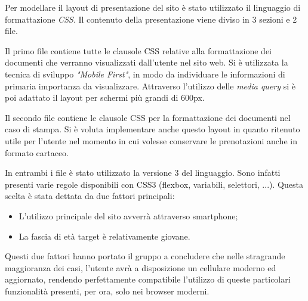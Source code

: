 Per modellare il layout di presentazione del sito è stato utilizzato il linguaggio di formattazione \textit{CSS}. Il contenuto della presentazione viene diviso in 3 sezioni e 2 file.

Il primo file contiene tutte le clausole CSS relative alla formattazione dei documenti che verranno visualizzati dall'utente nel sito web. Si è utilizzata la tecnica di sviluppo \textit{"Mobile First"}, in modo da individuare le informazioni di primaria importanza da visualizzare. Attraverso l'utilizzo delle \textit{media query} si è poi adattato il layout per schermi più grandi di 600px.

Il secondo file contiene le clausole CSS per la formattazione dei documenti nel caso di stampa. Si è voluta implementare anche questo layout in quanto ritenuto utile per l'utente nel momento in cui volesse conservare le prenotazioni anche in formato cartaceo.

In entrambi i file è stato utilizzato la versione 3 del linguaggio. Sono infatti presenti varie regole disponibili con CSS3 (flexbox, variabili, selettori, ...). Questa scelta è stata dettata da due fattori principali:
\begin{itemize}
\item L'utilizzo principale del sito avverrà attraverso smartphone;
\item La fascia di età target è relativamente giovane.
\end{itemize}

Questi due fattori hanno portato il gruppo a concludere che nelle stragrande maggioranza dei casi, l'utente avrà a disposizione un cellulare moderno ed aggiornato, rendendo perfettamente compatibile l'utilizzo di queste particolari funzionalità presenti, per ora, solo nei browser moderni.